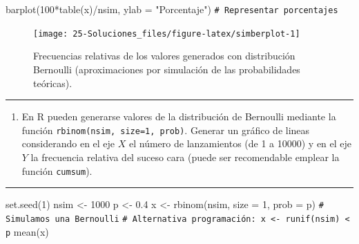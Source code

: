 \documentclass[
  10pt,
]{book}
\newenvironment{Shaded}{\begin{snugshade}}{\end{snugshade}}
\newcommand{\AttributeTok}[1]{\textcolor[rgb]{0.77,0.63,0.00}{#1}}
\newcommand{\CommentTok}[1]{\textcolor[rgb]{0.56,0.35,0.01}{\textit{#1}}}
\newcommand{\DecValTok}[1]{\textcolor[rgb]{0.00,0.00,0.81}{#1}}
\newcommand{\FloatTok}[1]{\textcolor[rgb]{0.00,0.00,0.81}{#1}}
\newcommand{\FunctionTok}[1]{\textcolor[rgb]{0.00,0.00,0.00}{#1}}
\newcommand{\NormalTok}[1]{#1}
\newcommand{\OtherTok}[1]{\textcolor[rgb]{0.56,0.35,0.01}{#1}}
\newcommand{\SpecialCharTok}[1]{\textcolor[rgb]{0.00,0.00,0.00}{#1}}
\newcommand{\StringTok}[1]{\textcolor[rgb]{0.31,0.60,0.02}{#1}}
\providecommand{\tightlist}{%
  \setlength{\itemsep}{0pt}\setlength{\parskip}{0pt}}
\theoremstyle{break}
\theoremstyle{nonumberplain}
\renewcommand{\CommentTok}[1]{\textcolor[rgb]{0.41,0.41,0.41}{\texttt{#1}}}
\begin{document}
\begin{Shaded}
\begin{Highlighting}[]
\FunctionTok{barplot}\NormalTok{(}\DecValTok{100}\SpecialCharTok{*}\FunctionTok{table}\NormalTok{(x)}\SpecialCharTok{/}\NormalTok{nsim, }\AttributeTok{ylab =} \StringTok{"Porcentaje"}\NormalTok{) }\CommentTok{\# Representar porcentajes }
\end{Highlighting}
\end{Shaded}

\begin{figure}[!htbp]

{\centering \texttt{[image: 25-Soluciones\_files/figure-latex/simberplot-1]} 

}

\caption{Frecuencias relativas de los valores generados con distribución Bernoulli (aproximaciones por simulación de las probabilidades teóricas).}\label{fig:simberplot}
\end{figure}

\begin{center}\rule{0.5\linewidth}{0.5pt}\end{center}

\begin{enumerate}
\def\labelenumi{\alph{enumi})}
\setcounter{enumi}{1}
\tightlist
\item
  En R pueden generarse valores de la distribución de Bernoulli
  mediante la función \texttt{rbinom(nsim,\ size=1,\ prob)}. Generar un
  gráfico de lineas considerando en el eje \(X\) el número de
  lanzamientos (de 1 a 10000) y en el eje \(Y\) la frecuencia
  relativa del suceso cara (puede ser recomendable emplear la
  función \texttt{cumsum}).
\end{enumerate}

\begin{center}\rule{0.5\linewidth}{0.5pt}\end{center}

\begin{Shaded}
\begin{Highlighting}[]
\FunctionTok{set.seed}\NormalTok{(}\DecValTok{1}\NormalTok{)}
\NormalTok{nsim }\OtherTok{\textless{}{-}} \DecValTok{1000}
\NormalTok{p }\OtherTok{\textless{}{-}} \FloatTok{0.4}
\NormalTok{x }\OtherTok{\textless{}{-}} \FunctionTok{rbinom}\NormalTok{(nsim, }\AttributeTok{size =} \DecValTok{1}\NormalTok{, }\AttributeTok{prob =}\NormalTok{ p) }\CommentTok{\# Simulamos una Bernoulli}
\CommentTok{\# Alternativa programación: x \textless{}{-} runif(nsim) \textless{} p}
\FunctionTok{mean}\NormalTok{(x)}
\end{Highlighting}
\end{Shaded}
\end{document}
